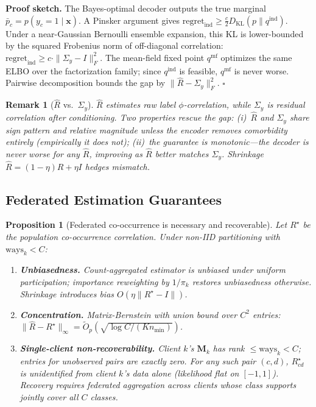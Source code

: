 \documentclass[conference]{IEEEtran}
\newtheorem{proposition}{Proposition}
\newtheorem{remark}{Remark}
\theoremstyle{definition}
\newcommand{\Rhat}{\widehat{R}}
\newcommand{\Sigmay}{\Sigma_{y}}
\begin{document}
\noindent\textbf{Proof sketch.} The Bayes-optimal decoder outputs the true marginal $\bar p_c{=}p(y_c{=}1{\mid}\mathbf{x})$. A Pinsker argument gives $\mathrm{regret}_{\mathrm{ind}}{\geq}\frac{c}{2}D_{\mathrm{KL}}(p\|q^{\mathrm{ind}})$. Under a near-Gaussian Bernoulli ensemble expansion, this KL is lower-bounded by the squared Frobenius norm of off-diagonal correlation: $\mathrm{regret}_{\mathrm{ind}}{\geq}c{\cdot}\|\Sigmay{-}I\|_F^{2}$. The mean-field fixed point $q^{\mathrm{mf}}$ optimizes the same ELBO over the factorization family; since $q^{\mathrm{ind}}$ is feasible, $q^{\mathrm{mf}}$ is never worse. Pairwise decomposition bounds the gap by $\|\Rhat{-}\Sigmay\|_F^{2}$. $\square$

\begin{remark}[$\Rhat$ vs.\ $\Sigmay$]
\label{rmk:caveat}
$\Rhat$ estimates raw label $\phi$-correlation, while $\Sigmay$ is residual correlation after conditioning. Two properties rescue the gap: (i)~$\Rhat$ and $\Sigmay$ share sign pattern and relative magnitude unless the encoder removes comorbidity entirely (empirically it does not); (ii)~the guarantee is monotonic---the decoder is never worse for \emph{any} $\Rhat$, improving as $\Rhat$ better matches $\Sigmay$. Shrinkage $\Rhat{=}(1{-}\eta)R{+}\eta I$ hedges mismatch.
\end{remark}

\subsection{Federated Estimation Guarantees}

\begin{proposition}[Federated co-occurrence is necessary and recoverable]
\label{prop:estimation}
Let $R^{\star}$ be the population co-occurrence correlation. Under non-IID partitioning with $\text{ways}_k{<}C$:
\begin{enumerate}[leftmargin=*,itemsep=1pt]
  \item[(a)] \textbf{Unbiasedness.} Count-aggregated estimator is unbiased under uniform participation; importance reweighting by $1/\pi_k$ restores unbiasedness otherwise. Shrinkage introduces bias $O(\eta\|R^{\star}{-}I\|)$.
  \item[(b)] \textbf{Concentration.} Matrix-Bernstein with union bound over $C^{2}$ entries: $\|\Rhat-R^{\star}\|_\infty{=}\tilde O_p(\sqrt{\log C/(K n_{\min})})$.
  \item[(c)] \textbf{Single-client non-recoverability.} Client $k$'s $\mathbf{M}_k$ has rank $\leq\text{ways}_k{<}C$; entries for unobserved pairs are exactly zero. For any such pair $(c,d)$, $R^{\star}_{cd}$ is unidentified from client $k$'s data alone (likelihood flat on $[-1,1]$). Recovery requires federated aggregation across clients whose class supports jointly cover all $C$ classes.
\end{enumerate}
\end{proposition}
\end{document}
